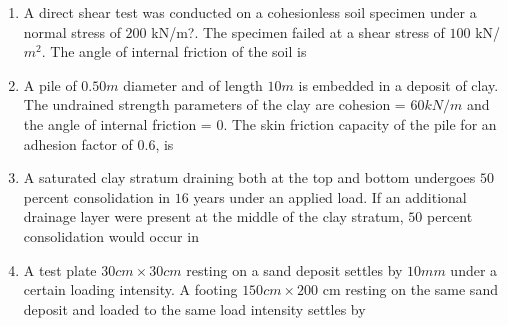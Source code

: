 \documentclass[journal]{IEEEtran}
\begin{document}
\begin{enumerate}
\item A direct shear test was conducted on a cohesionless soil  specimen under a normal stress of $200$ kN/m?. The specimen failed at a shear stress of $100$ kN/$m^{2}$. The angle of internal friction of the soil  is \hfill {}

\begin{enumerate}
\end{enumerate}

\item A pile of $0.50 m$ diameter and of length $10 m$ is embedded in a deposit of clay. The undrained strength parameters of the clay are cohesion = $60 kN/m$ and the angle of internal friction = $0$. The skin friction capacity  of the pile for an adhesion factor of $0.6$, is \hfill {}

\begin{enumerate}
\end{enumerate}

\item A saturated clay stratum draining both at the top and bottom undergoes $50$ percent consolidation in $16$ years under an applied load. If an additional drainage layer were present at the middle of the clay stratum, $50$ percent consolidation would occur in \hfill {}

\begin{enumerate}
\end{enumerate}

\item A test plate $30 cm \times 30 cm$ resting on a sand deposit settles by $10 mm$ under a certain loading intensity. A footing $150 cm \times 200$ cm resting on the same sand deposit and loaded to the same load intensity settles by \hfill {}


\end{enumerate}
\end{document}
